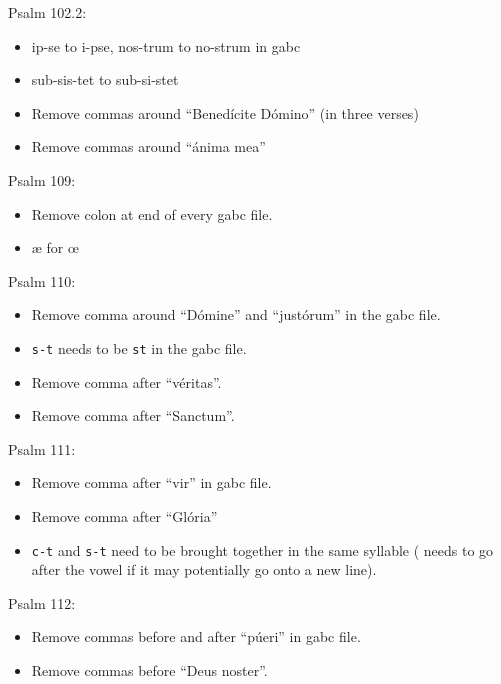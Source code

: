 \documentclass[11pt]{article}
\begin{document}
 Psalm 102.2:
  \begin{itemize}
  \item ip-se to i-pse, nos-trum to no-strum in gabc
  \item  sub-sis-tet to sub-si-stet
  \item
 Remove commas around  ``Benedícite Dómino'' (in three verses)
\item
 Remove commas around ``ánima mea''
    \end{itemize}

 
Psalm 109:
\begin{itemize}
\item Remove colon at end of every gabc file.
\item æ for œ
\end{itemize}
 
 Psalm 110:
\begin{itemize}
\item Remove comma around ``Dómine'' and ``justórum''  in the gabc file.
\item
 \texttt{s-t} needs to be  \texttt{st} in the gabc file.
\item Remove comma after ``véritas''.
\item Remove comma after ``Sanctum''.
\end{itemize}

 Psalm 111:
\begin{itemize}
\item
Remove comma after ``vir'' in gabc file.
\item Remove comma after ``Glória''
\item \texttt{c-t} and \texttt{s-t} need to be brought together in the same syllable (\verb|| needs to go after the vowel if it may potentially go onto a new line).
\end{itemize}

 Psalm 112:
  \begin{itemize}
\item Remove commas before and after ``púeri'' in gabc file.
\item Remove commas before ``Deus noster''.
 \end{itemize}
 
\end{document}
